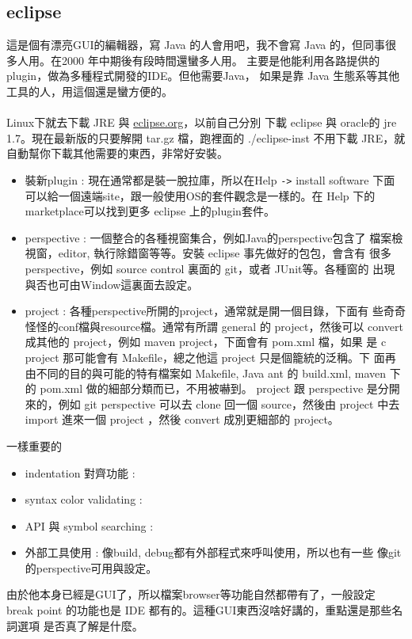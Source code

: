     \subsection{eclipse}
    這是個有漂亮GUI的編輯器，寫 Java 的人會用吧，我不會寫 Java 的，但同事很
    多人用。在2000 年中期後有段時間還蠻多人用。
    主要是他能利用各路提供的plugin，做為多種程式開發的IDE。但他需要Java，
    如果是靠 Java 生態系等其他工具的人，用這個還是蠻方便的。
    \\\\
    Linux下就去下載 JRE 與 \href{https://eclipse.org}{eclipse.org}，以前自己分別
    下載 eclipse 與 oracle的 jre 1.7。現在最新版的只要解開 tar.gz 檔，跑裡面的
    ./eclipse-inst 不用下載 JRE，就自動幫你下載其他需要的東西，非常好安裝。
    \begin{itemize}
      \item 裝新plugin : 現在通常都是裝一脫拉庫，所以在Help \verb=->= install
        software 下面可以給一個遠端site，跟一般使用OS的套件觀念是一樣的。在 Help
        下的 marketplace可以找到更多 eclipse 上的plugin套件。
      \item perspective : 一個整合的各種視窗集合，例如Java的perspective包含了
        檔案檢視窗，editor, 執行除錯窗等等。安裝 eclipse 事先做好的包包，會含有
        很多perspective，例如 source control 裏面的 git，或者 JUnit等。各種窗的
        出現與否也可由Window這裏面去設定。
      \item project : 各種perspective所開的project，通常就是開一個目錄，下面有
        些奇奇怪怪的conf檔與resource檔。通常有所謂 general 的 project，然後可以
        convert 成其他的 project，例如 maven project，下面會有 pom.xml 檔，如果
        是 c project 那可能會有 Makefile，總之他這 project 只是個籠統的泛稱。下
        面再由不同的目的與可能的特有檔案如 Makefile, Java ant 的 build.xml, 
        maven 下的 pom.xml 做的細部分類而已，不用被嚇到。
        project 跟 perspective 是分開來的，例如 git perspective 可以去 clone
        回一個 source，然後由 project 中去 import 進來一個 project ，然後 convert
        成別更細部的 project。
    \end{itemize}
    一樣重要的
    \begin{itemize}
      \item indentation 對齊功能 :
      \item syntax color validating :
      \item API 與 symbol searching :
      \item 外部工具使用 : 像build, debug都有外部程式來呼叫使用，所以也有一些
        像git的perspective可用與設定。
    \end{itemize}
    由於他本身已經是GUI了，所以檔案browser等功能自然都帶有了，一般設定 break
    point 的功能也是 IDE 都有的。這種GUI東西沒啥好講的，重點還是那些名詞選項
    是否真了解是什麼。


